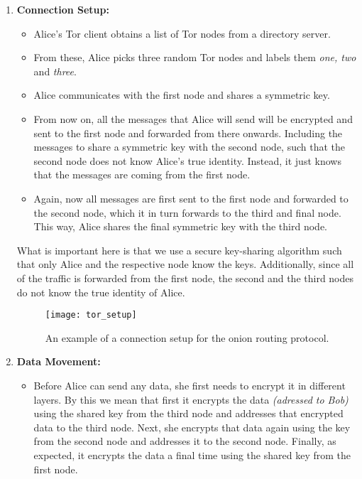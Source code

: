 \begin{enumerate}
  \item \textbf{Connection Setup:}
    \begin{itemize}
      \item Alice's Tor client obtains a list of Tor nodes from a directory server.
      \item From these, Alice picks three random Tor nodes and labels them \textit{one, two} and \textit{three}.
      \item Alice communicates with the first node and shares a symmetric key.
      \item From now on, all the messages that Alice will send will be encrypted and sent to the first node and forwarded from there onwards.
        Including the messages to share a symmetric key with the second node, such that the second node does not know Alice's true identity.
        Instead, it just knows that the messages are coming from the first node.
      \item Again, now all messages are first sent to the first node and forwarded to the second node, which it in turn forwards to the third and final node.
        This way, Alice shares the final symmetric key with the third node.
    \end{itemize}

    What is important here is that we use a secure key-sharing algorithm such that only Alice and the respective node know the keys.
    Additionally, since all of the traffic is forwarded from the first node, the second and the third nodes do not know the true identity of Alice.

    \begin{figure}[ht]
      \centering
      \texttt{[image: tor\_setup]}
      \caption{An example of a connection setup for the onion routing protocol.}
      \label{fig:tor_setup}
    \end{figure}

  \newpage

  \item \textbf{Data Movement:}
    \begin{itemize}
      \item Before Alice can send any data, she first needs to encrypt it in different layers. By this we mean that first it encrypts the data \textit{(adressed to Bob)}
        using the shared key from the third node and addresses that encrypted data to the third node.
        Next, she encrypts that data again using the key from the second node and addresses it to the second node.
        Finally, as expected, it encrypts the data a final time using the shared key from the first node.


\end{itemize}
\end{enumerate}

